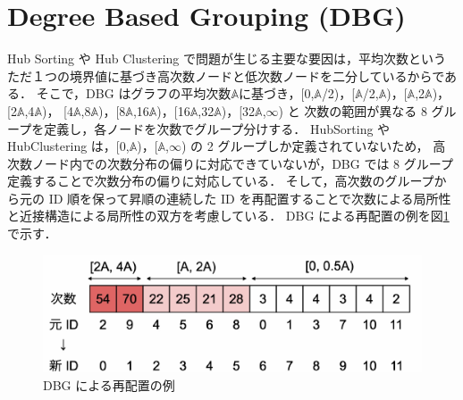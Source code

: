 \section{Degree Based Grouping (DBG)}
\label{dbg}
Hub Sorting や Hub Clustering で問題が生じる主要な要因は，平均次数というただ１つの境界値に基づき高次数ノードと低次数ノードを二分しているからである．
そこで，DBG \cite{faldu2019closer}はグラフの平均次数$\mathbb{A}$に基づき，[0,$\mathbb{A}$/2)，[$\mathbb{A}$/2,$\mathbb{A}$)，[$\mathbb{A}$,2$\mathbb{A}$)，[2$\mathbb{A}$,4$\mathbb{A}$)，
[4$\mathbb{A}$,8$\mathbb{A}$)，[8$\mathbb{A}$,16$\mathbb{A}$)，[16$\mathbb{A}$,32$\mathbb{A}$)，[32$\mathbb{A}$,$\infty$)
と 次数の範囲が異なる 8 グループを定義し，各ノードを次数でグループ分けする．
HubSorting や HubClustering は，[0,$\mathbb{A}$)，[$\mathbb{A}$,$\infty$) の 2 グループしか定義されていないため，
高次数ノード内での次数分布の偏りに対応できていないが，DBG では 8 グループ定義することで次数分布の偏りに対応している．
そして，高次数のグループから元の ID 順を保って昇順の連続した ID を再配置することで次数による局所性と近接構造による局所性の双方を考慮している．
DBG による再配置の例を図\ref{dbg} で示す．
\begin{figure}[t]
  \centering
  \includegraphics[width=\linewidth]{./figure/dbg.pdf}
  \caption{DBG による再配置の例}
  \label{sec:dbg}
\end{figure}
